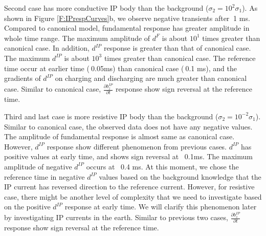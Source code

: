 \documentclass[a4paper, 11pt]{article}
\newcommand{\dip}{d^{IP}}
\begin{document}
Second case has more conductive IP body than the background ($\sigma_2 = 10^{2}\sigma_1$). As shown in Figure \ref{F:IPrespCurves}b, we observe negative transients after $~$1 ms. Compared to canonical model, fundamental response has greater amplitude in whole time range. The maximum amplitude of $d^{F}$ is about $10^{1}$ times greater than canonical case.  In addition, $\dip$ response is greater than that of canonical case. The maximum $\dip$ is about $10^{3}$ times greater than canonical case.  The reference time occur at earlier time ($~$0.05ms) than canonical case ($~$0.1 ms), and the gradients of $\dip$ on charging and discharging are much greater than canonical case. Similar to canonical case, $\frac{\partial b^{IP}_z}{\partial t}$ response show sign reversal at the reference time. 

Third and last case is more resistive IP body than the background ($\sigma_2 = 10^{-2}\sigma_1$). Similar to canonical case, the observed data does not have any negative values. The amplitude of fundamental response is almost same as canonical case. However, $\dip$ response show different phenomenon from previous cases. $\dip$ has positive values at early time, and shows sign reversal at ~0.1ms. The maximum amplitude of negative $\dip$ occurs at ~0.4 ms. At this moment, we chose the reference time in negative $\dip$ values based on the background knowledge that the IP current has reversed direction to the reference current. However, for resistive case, there might be another level of complexity that we need to investigate based on the positive $\dip$ response at early time. We will clarify this phenomenon later by investigating IP currents in the earth. Similar to previous two cases, $\frac{\partial b^{IP}_z}{\partial t}$ response show sign reversal at the reference time. 
\end{document}

